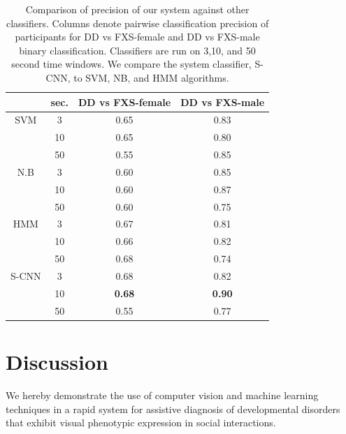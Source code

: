\documentclass[10pt,twocolumn,letterpaper]{article}
\begin{document}
\begin{table}
\begin{tabular}{c|c|c|c}

                 & sec. & DD vs FXS-female & DD vs FXS-male \\

\hline
SVM  & 3  & 0.65 & 0.83\\
          & 10 & 0.65 & 0.80 \\
          & 50 & 0.55 & 0.85 \\

\hline
N.B   & 3  & 0.60 & 0.85\\
         & 10 & 0.60 & 0.87\\
         & 50 & 0.60 & 0.75\\

\hline
HMM & 3  & 0.67 & 0.81\\ 
    & 10 & 0.66 & 0.82\\
    & 50 & 0.68 & 0.74\\

\Xhline{4\arrayrulewidth}
S-CNN & 3 & 0.68 & 0.82 \\
	     & 10 & \bf{0.68} & \bf{0.90} \\
    	     & 50 & 0.55 & 0.77\\


\end{tabular}
\caption{Comparison of precision of our system against other classifiers. Columns denote pairwise classification precision of participants for DD vs FXS-female and DD vs FXS-male binary classification. Classifiers are run on 3,10, and 50 second time windows. We compare the system classifier, S-CNN, to SVM, NB, and HMM algorithms.}
\label{table:profiler}
\end{table}




\section{Discussion}

We hereby demonstrate the use of computer vision and machine learning techniques in a rapid system for assistive diagnosis of developmental disorders that exhibit visual phenotypic expression in social interactions. 
\end{document}
